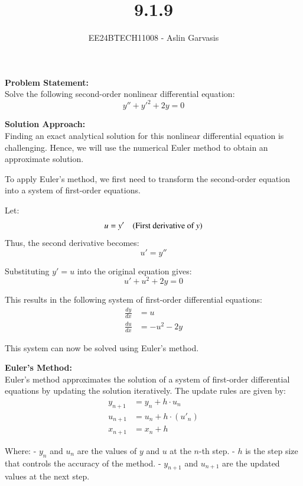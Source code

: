\documentclass[journal]{IEEEtran}
\begin{document}
\title{9.1.9}
\author{EE24BTECH11008 - Aslin Garvasis}
\maketitle

\textbf{Problem Statement:}\\
Solve the following second-order nonlinear differential equation:
\begin{equation}
y'' + y'^2 + 2y = 0
\end{equation}

\textbf{Solution Approach:}\\
Finding an exact analytical solution for this nonlinear differential equation is challenging. Hence, we will use the numerical Euler method to obtain an approximate solution.

To apply Euler’s method, we first need to transform the second-order equation into a system of first-order equations.

Let:
\[
u = y' \quad \text{(First derivative of \( y \))}
\]
Thus, the second derivative becomes:
\[
u' = y''
\]

Substituting \( y' = u \) into the original equation gives:
\begin{equation}
u' + u^2 + 2y = 0
\end{equation}

This results in the following system of first-order differential equations:
\begin{align}
\frac{dy}{dx} &= u \\
\frac{du}{dx} &= -u^2 - 2y
\end{align}

This system can now be solved using Euler's method.

\textbf{Euler’s Method:}\\
Euler's method approximates the solution of a system of first-order differential equations by updating the solution iteratively. The update rules are given by:
\begin{align}
y_{n+1} &= y_n + h \cdot u_n \\
u_{n+1} &= u_n + h \cdot (u'_n) \\
x_{n+1} &= x_n + h
\end{align}

Where:
- \( y_n \) and \( u_n \) are the values of \( y \) and \( u \) at the \( n \)-th step.
- \( h \) is the step size that controls the accuracy of the method.
- \( y_{n+1} \) and \( u_{n+1} \) are the updated values at the next step.
\end{document}
